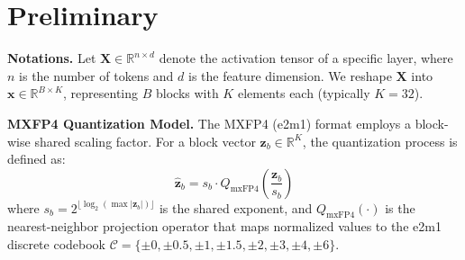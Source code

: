 \section{Preliminary}
\label{sec:preliminary}

\textbf{Notations.} Let $\mathbf{X} \in \mathbb{R}^{n \times d}$ denote the activation tensor of a specific layer, where $n$ is the number of tokens and $d$ is the feature dimension. We reshape $\mathbf{X}$ into $\mathbf{x} \in \mathbb{R}^{B \times K}$, representing $B$ blocks with $K$ elements each (typically $K=32$).

\textbf{MXFP4 Quantization Model.} The MXFP4 (e2m1) format employs a block-wise shared scaling factor. For a block vector $\mathbf{z}_b \in \mathbb{R}^K$, the quantization process is defined as:
\begin{equation}
\hat{\mathbf{z}}_b = s_b \cdot Q_{\text{mxFP4}}\left( \frac{\mathbf{z}_b}{s_b} \right)
\end{equation}
where $s_b = 2^{\lfloor \log_2 (\max |\mathbf{z}_b|) \rfloor}$ is the shared exponent, and $Q_{\text{mxFP4}}(\cdot)$ is the nearest-neighbor projection operator that maps normalized values to the e2m1 discrete codebook $\mathcal{C} = \{\pm 0, \pm 0.5, \pm 1, \pm 1.5, \pm 2, \pm 3, \pm 4, \pm 6\}$.